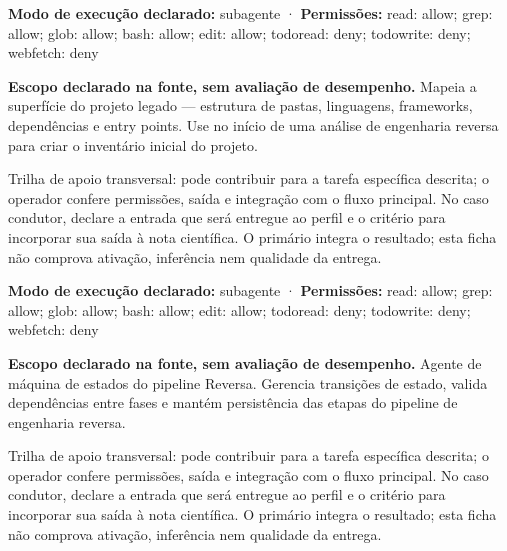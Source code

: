 \begin{arquitetura}
\textbf{Modo de execução declarado:} subagente · \textbf{Permissões:} read: allow; grep: allow; glob: allow; bash: allow; edit: allow; todoread: deny; todowrite: deny; webfetch: deny
\end{arquitetura}


\begin{descricao}
\textbf{Escopo declarado na fonte, sem avaliação de desempenho.}
Mapeia a superfície do projeto legado — estrutura de pastas, linguagens, frameworks, dependências e entry points. Use no início de uma análise de engenharia reversa para criar o inventário inicial do projeto.
\end{descricao}

\begin{funcao}
Trilha de apoio transversal: pode contribuir para a tarefa específica descrita; o operador confere permissões, saída e integração com o fluxo principal. No caso condutor, declare a entrada que será entregue ao perfil e o critério para incorporar sua saída à nota científica. O primário integra o resultado; esta ficha não comprova ativação, inferência nem qualidade da entrega.
\end{funcao}

\begin{arquitetura}
\textbf{Modo de execução declarado:} subagente · \textbf{Permissões:} read: allow; grep: allow; glob: allow; bash: allow; edit: allow; todoread: deny; todowrite: deny; webfetch: deny
\end{arquitetura}


\begin{descricao}
\textbf{Escopo declarado na fonte, sem avaliação de desempenho.}
Agente de máquina de estados do pipeline Reversa. Gerencia transições de estado, valida dependências entre fases e mantém persistência das etapas do pipeline de engenharia reversa.
\end{descricao}

\begin{funcao}
Trilha de apoio transversal: pode contribuir para a tarefa específica descrita; o operador confere permissões, saída e integração com o fluxo principal. No caso condutor, declare a entrada que será entregue ao perfil e o critério para incorporar sua saída à nota científica. O primário integra o resultado; esta ficha não comprova ativação, inferência nem qualidade da entrega.
\end{funcao}

